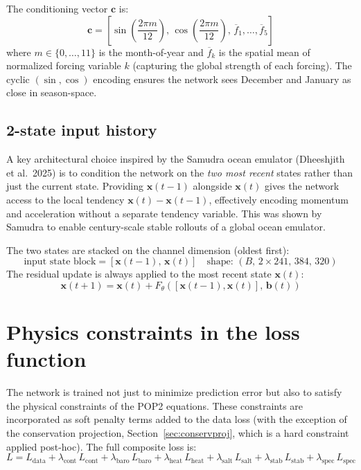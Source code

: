 \documentclass[11pt]{article}
\begin{document}
The conditioning vector $\mathbf{c}$ is:
\begin{equation}
\mathbf{c} = \left[\sin\!\left(\frac{2\pi m}{12}\right),\,
                   \cos\!\left(\frac{2\pi m}{12}\right),\,
                   \overline{f}_1,\ldots,\overline{f}_5\right]
\end{equation}
where $m\in\{0,\ldots,11\}$ is the month-of-year and $\overline{f}_k$ is the
spatial mean of normalized forcing variable $k$ (capturing the global strength
of each forcing). The cyclic $(\sin,\cos)$ encoding ensures the network sees
December and January as close in season-space.

\subsection{2-state input history}
\label{sec:history}
A key architectural choice inspired by the Samudra ocean emulator
(Dheeshjith et al.\ 2025) is to condition the network on the \emph{two most
recent} states rather than just the current state. Providing $\mathbf{x}(t-1)$
alongside $\mathbf{x}(t)$ gives the network access to the local tendency
$\mathbf{x}(t)-\mathbf{x}(t-1)$, effectively encoding momentum and
acceleration without a separate tendency variable. This was shown by Samudra to
enable century-scale stable rollouts of a global ocean emulator.

The two states are stacked on the channel dimension (oldest first):
\begin{equation}
\text{input state block} = [\mathbf{x}(t-1),\, \mathbf{x}(t)]\quad
\text{shape: }(B,\,2\times241,\,384,\,320)
\end{equation}
The residual update is always applied to the most recent state $\mathbf{x}(t)$:
\begin{equation}
\mathbf{x}(t+1) = \mathbf{x}(t) + F_\theta\!\left([\mathbf{x}(t-1),\mathbf{x}(t)],\,\mathbf{b}(t)\right)
\end{equation}

\section{Physics constraints in the loss function}
\label{sec:physics}

The network is trained not just to minimize prediction error but also to satisfy
the physical constraints of the POP2 equations. These constraints are
incorporated as soft penalty terms added to the data loss (with the exception of
the conservation projection, Section~\ref{sec:conservproj}, which is a hard
constraint applied post-hoc). The full composite loss is:
\begin{equation}
L = L_\text{data} + \lambda_\text{cont}\,L_\text{cont}
  + \lambda_\text{baro}\,L_\text{baro}
  + \lambda_\text{heat}\,L_\text{heat}
  + \lambda_\text{salt}\,L_\text{salt}
  + \lambda_\text{stab}\,L_\text{stab}
  + \lambda_\text{spec}\,L_\text{spec}
\label{eq:totalloss}
\end{equation}
\end{document}

